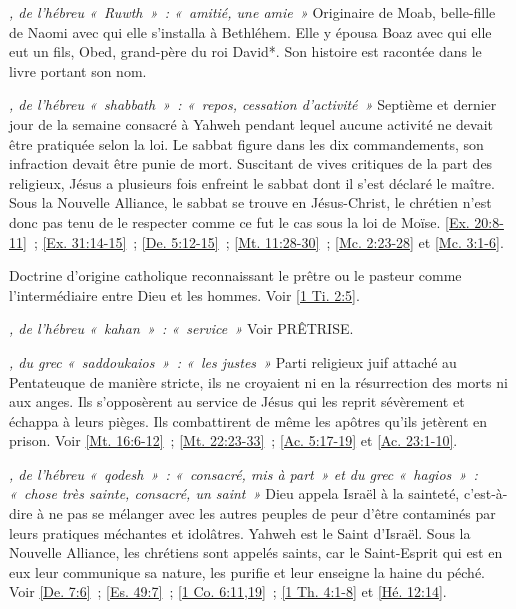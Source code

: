 \begin{multicols}{2}
\textit{, de l'hébreu «~Ruwth~»~: «~amitié, une amie~»}\newline
Originaire de Moab, belle-fille de Naomi avec qui elle s'installa à Bethléhem. Elle y épousa Boaz avec qui elle eut un fils, Obed, grand-père du roi David*. Son histoire est racontée dans le livre portant son nom.

\textit{, de l'hébreu «~shabbath~»~: «~repos, cessation d'activité~»}\newline
Septième et dernier jour de la semaine consacré à Yahweh pendant lequel aucune activité ne devait être pratiquée selon la loi. Le sabbat figure dans les dix commandements, son infraction devait être punie de mort. Suscitant de vives critiques de la part des religieux, Jésus a plusieurs fois enfreint le sabbat dont il s'est déclaré le maître. Sous la Nouvelle Alliance, le sabbat se trouve en Jésus-Christ, le chrétien n'est donc pas tenu de le respecter comme ce fut le cas sous la loi de Moïse. \vref{Ex. 20:8-11}~; \vref{Ex. 31:14-15}~; \vref{De. 5:12-15}~; \vref{Mt. 11:28-30}~; \vref{Mc. 2:23-28} et \vref{Mc. 3:1-6}.

\textit{}\newline
Doctrine d'origine catholique reconnaissant le prêtre ou le pasteur comme l'intermédiaire entre Dieu et les hommes. Voir \vref{1 Ti. 2:5}.

\textit{, de l'hébreu «~kahan~»~: «~service~»}\newline
Voir PRÊTRISE.

\textit{, du grec «~saddoukaios~»~: «~les justes~»}\newline
Parti religieux juif attaché au Pentateuque de manière stricte, ils ne croyaient ni en la résurrection des morts ni aux anges. Ils s'opposèrent au service de Jésus qui les reprit sévèrement et échappa à leurs pièges. Ils combattirent de même les apôtres qu'ils jetèrent en prison. Voir \vref{Mt. 16:6-12}~; \vref{Mt. 22:23-33}~; \vref{Ac. 5:17-19} et \vref{Ac. 23:1-10}.

\textit{, de l'hébreu «~qodesh~»~: «~consacré, mis à part~» et du grec «~hagios~»~: «~chose très sainte, consacré, un saint~»}\newline
Dieu appela Israël à la sainteté, c'est-à-dire à ne pas se mélanger avec les autres peuples de peur d'être contaminés par leurs pratiques méchantes et idolâtres. Yahweh est le Saint d'Israël. Sous la Nouvelle Alliance, les chrétiens sont appelés saints, car le Saint-Esprit qui est en eux leur communique sa nature, les purifie et leur enseigne la haine du péché. Voir \vref{De. 7:6}~; \vref{Es. 49:7}~; \vref{1 Co. 6:11,19}~; \vref{1 Th. 4:1-8} et \vref{Hé. 12:14}.


\end{multicols}
